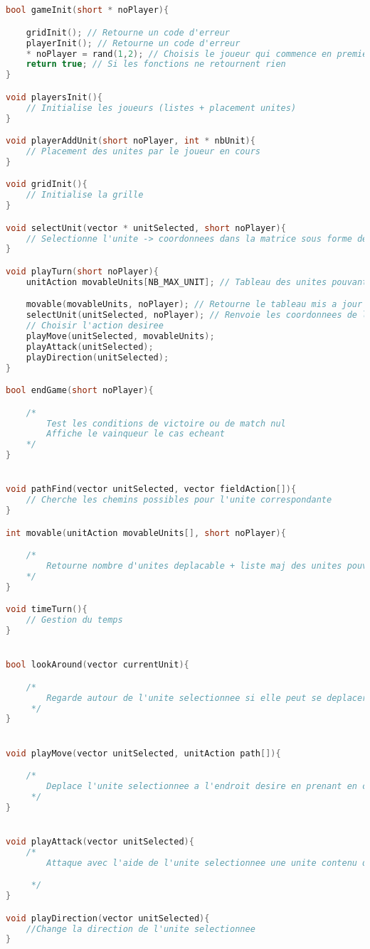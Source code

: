 \documentclass[a4paper,10pt]{extreport}
\begin{document}
\begin{lstlisting}[language=c]


bool gameInit(short * noPlayer){

	gridInit(); // Retourne un code d'erreur
	playerInit(); // Retourne un code d'erreur
	* noPlayer = rand(1,2); // Choisis le joueur qui commence en premier
	return true; // Si les fonctions ne retournent rien
}

void playersInit(){
	// Initialise les joueurs (listes + placement unites)
}

void playerAddUnit(short noPlayer, int * nbUnit){
	// Placement des unites par le joueur en cours
}

void gridInit(){
	// Initialise la grille
}

void selectUnit(vector * unitSelected, short noPlayer){
	// Selectionne l'unite -> coordonnees dans la matrice sous forme de vecteur
}

void playTurn(short noPlayer){
	unitAction movableUnits[NB_MAX_UNIT]; // Tableau des unites pouvant se deplacer + deplacement possible

	movable(movableUnits, noPlayer); // Retourne le tableau mis a jour + nombre d'unites pouvant se deplacer
	selectUnit(unitSelected, noPlayer); // Renvoie les coordonnees de l'unite selectionnee
	// Choisir l'action desiree 
	playMove(unitSelected, movableUnits);
	playAttack(unitSelected);
	playDirection(unitSelected);
}

bool endGame(short noPlayer){

	/* 	
		Test les conditions de victoire ou de match nul
	 	Affiche le vainqueur le cas echeant
	*/
}


void pathFind(vector unitSelected, vector fieldAction[]){
	// Cherche les chemins possibles pour l'unite correspondante
}

int movable(unitAction movableUnits[], short noPlayer){

	/* 	
		Retourne nombre d'unites deplacable + liste maj des unites pouvant se deplacer
	*/
}

void timeTurn(){
	// Gestion du temps
}


bool lookAround(vector currentUnit){

	/*
		Regarde autour de l'unite selectionnee si elle peut se deplacer sur une case si TP pas permise alors deplacement impossible
	 */
}


void playMove(vector unitSelected, unitAction path[]){

	/*
		Deplace l'unite selectionnee a l'endroit desire en prenant en compte les chemins possibles
	 */
}


void playAttack(vector unitSelected){
	/*
		Attaque avec l'aide de l'unite selectionnee une unite contenu dans la liste du joueur correspondant

	 */
}

void playDirection(vector unitSelected){
	//Change la direction de l'unite selectionnee
}

\end{lstlisting}
\end{document}
